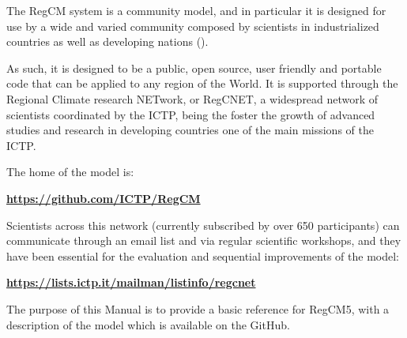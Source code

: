 The \ac{RegCM} system is a community model, and in particular it is designed
for use by a wide and varied community composed by scientists in industrialized
countries as well as developing nations (\cite{Pal_07}).

As such, it is designed to be a public, open source, user friendly and portable
code that can be applied to any region of the World. It is supported through
the Regional Climate research NETwork, or RegCNET, a widespread network of
scientists coordinated by the \ac{ICTP},
being the foster the growth of advanced studies and research in developing
countries one of the main missions of the \ac{ICTP}.

The home of the model is:

\begin{center}
	{\bf \url{https://github.com/ICTP/RegCM}}
\end{center}

Scientists across this network (currently subscribed by over 650 participants)
can communicate through an email list and via regular scientific workshops,
and they have been essential for the evaluation and sequential improvements of
the model:

\begin{center}
	{\bf \url{https://lists.ictp.it/mailman/listinfo/regcnet}}
\end{center}

The purpose of this Manual is to provide a basic reference for \ac{RegCM}5, with
a description of the model which is available on the GitHub.

\vfill

